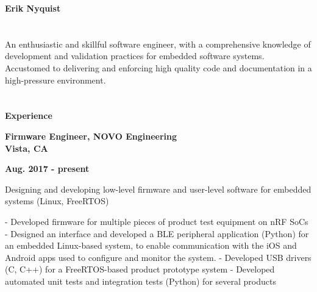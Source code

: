 \documentclass[6pt]{article}
\begin{document}
\centerline{\Huge \bfseries Erik Nyquist}
\section*{}

An enthusiastic and skillful software engineer, with a comprehensive knowledge of
development and validation practices for embedded software systems. Accustomed to
delivering and enforcing high quality code and documentation in a high-pressure
environment.

\section*{}
{\Large \bfseries Experience}
\break

\hspace*{-\parindent}%
\begin{minipage}{20em}
{\bfseries Firmware Engineer, NOVO Engineering \\
Vista, CA}
\end{minipage}
\hfill
\begin{minipage}{10em}
{
    \bfseries \hfill Aug. 2017 - present \\

}
\end{minipage}
\break
\break
Designing and developing low-level firmware and user-level software for embedded
systems (Linux, FreeRTOS)

- Developed firmware for multiple pieces of product test equipment on nRF SoCs
- Designed an interface and developed a BLE peripheral application (Python) for an
embedded Linux-based system, to enable communication with the iOS and Android
apps used to configure and monitor the system.
- Developed USB drivers (C, C++) for a FreeRTOS-based product prototype system
- Developed automated unit tests and integration tests (Python) for several products
\break
\break
\end{document}
